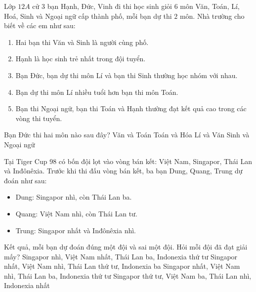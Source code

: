 \begin{ex}
Lớp $12A$ cử $3$ bạn Hạnh, Đức, Vinh đi thi học sinh giỏi $6$ môn Văn, Toán, Lí, Hoá, Sinh và Ngoại ngữ cấp thành phố, mỗi bạn dự thi $2$ môn. Nhà trường cho biết về các em như sau:
\begin{enumerate} 
\item Hai bạn thi Văn và Sinh là người cùng phố.
\item Hạnh là học sinh trẻ nhất trong đội tuyển.
\item Bạn Đức, bạn dự thi môn Lí và bạn thi Sinh thường học nhóm với nhau.
\item Bạn dự thi môn Lí nhiều tuổi hơn bạn thi môn Toán.
\item Bạn thi Ngoại ngữ, bạn thi Toán và Hạnh thường đạt kết quả cao trong các vòng thi tuyển.
\end{enumerate}
Bạn Đức thi hai môn nào sau đây?
\choice
{\True Văn và Toán}
{Toán và Hóa}
{Lí và Văn}
{Sinh và Ngoại ngữ}
\end{ex}

\begin{ex}
Tại Tiger Cup 98 có bốn đội lọt vào vòng bán kết: Việt Nam, Singapor, Thái Lan và Inđônêxia. Trước khi thi đấu vòng bán kết, ba bạn Dung, Quang, Trung dự đoán như sau:
\begin{itemize}
\item Dung: Singapor nhì, còn Thái Lan ba.
\item Quang: Việt Nam nhì, còn Thái Lan tư.
\item Trung: Singapor nhất và Inđônêxia nhì.
\end{itemize}
Kết quả, mỗi bạn dự đoán đúng một đội và sai một đội. Hỏi mỗi đội đã đạt giải mấy?
\choice
{Singapor nhì, Việt Nam nhất, Thái Lan ba, Indonexia thứ tư}
{Singapor nhất, Việt Nam nhì, Thái Lan thứ tư, Indonexia ba}
{\True Singapor nhất, Việt Nam nhì, Thái Lan ba, Indonexia thứ tư}
{Singapor thứ tư, Việt Nam ba, Thái Lan nhì, Indonexia nhất}
\end{ex}

